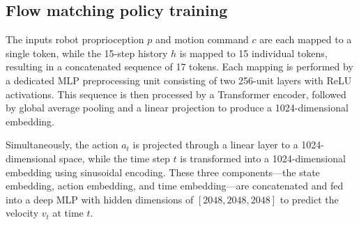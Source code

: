







\subsection{Flow matching policy training}
The inputs robot proprioception $p$ and motion command $c$ are each mapped to a single token, while the 15-step history $h$ is mapped to 15 individual tokens, resulting in a concatenated sequence of 17 tokens. Each mapping is performed by a dedicated MLP preprocessing unit consisting of two 256-unit layers with ReLU activations. This sequence is then processed by a Transformer encoder, followed by global average pooling and a linear projection to produce a 1024-dimensional embedding.

Simultaneously, the action $a_t$ is projected through a linear layer to a 1024-dimensional space, while the time step $t$ is transformed into a 1024-dimensional embedding using sinusoidal encoding. These three components—the state embedding, action embedding, and time embedding—are concatenated and fed into a deep MLP with hidden dimensions of $[2048, 2048, 2048]$ to predict the velocity $v_t$ at time $t$.

